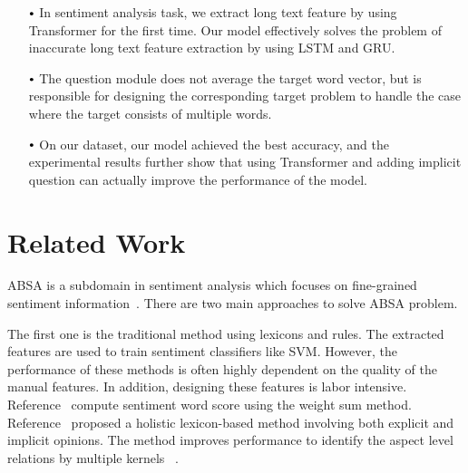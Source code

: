 \documentclass{ieeeaccess}
\begin{document}
 \begin{itemize}

 	\item[$\vcenter{\hbox{\tiny$\bullet$}}$] In sentiment analysis task, we extract long text feature by using Transformer for the first time. Our model effectively solves the problem of inaccurate long text feature extraction by using LSTM and GRU.

 	\item[$\vcenter{\hbox{\tiny$\bullet$}}$] The question module does not average the target word vector, but is responsible for designing the corresponding target problem to handle the case where the target consists of multiple words.

 	\item[$\vcenter{\hbox{\tiny$\bullet$}}$] On our dataset, our model achieved the best accuracy, and the experimental results further show that using Transformer and adding implicit question can actually improve the performance of the model.

 \end{itemize}

\section{Related Work}
ABSA is a subdomain in sentiment analysis which focuses on fine-grained sentiment information~\cite{DBLP:series/synthesis/2012Liu}. There are two main approaches to solve ABSA problem.

The first one is the traditional method using lexicons and rules. The extracted features are used to train sentiment classifiers like SVM. However, the performance of these methods is often highly dependent on the quality of the manual features. In addition, designing these features is labor intensive. Reference~\cite{DBLP:conf/kdd/HuL04} compute sentiment word score using the weight sum method. Reference~\cite{DBLP:conf/wsdm/DingLY08} proposed a holistic lexicon-based method involving both explicit and implicit opinions. The method improves performance to identify the aspect level relations by multiple kernels ~\cite{DBLP:conf/cicling/NguyenS15}.
\end{document}
